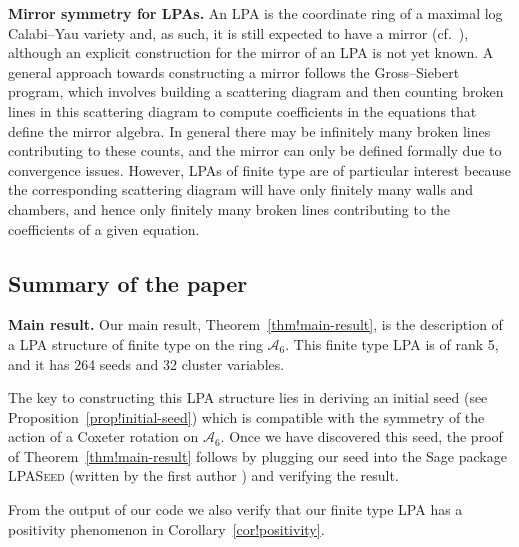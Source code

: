 \documentclass[pdftex]{sigma}
\numberwithin{equation}{section}
\theoremstyle{definition}
\begin{document}
{\bf Mirror symmetry for LPAs.}
An LPA is the coordinate ring of a maximal log Calabi--Yau variety and, as such, it is still expected to have a mirror (cf.\ \cite[Conjecture 2.5]{duc}), although an explicit construction for the mirror of an LPA is not yet known. A general approach towards constructing a mirror follows the Gross--Siebert program, which involves building a scattering diagram and then counting broken lines in this scattering diagram to compute coefficients in the equations that define the mirror algebra. In general there may be infinitely many broken lines contributing to these counts, and the mirror can only be defined formally due to convergence issues. However, LPAs of finite type are of particular interest because the corresponding scattering diagram will have only finitely many walls and chambers, and hence only finitely many broken lines contributing to the coefficients of a given equation.

\subsection{Summary of the paper}

{\bf Main result.}
Our main result, Theorem~\ref{thm!main-result}, is the description of a LPA structure of finite type on the ring $\mathcal A_6$. This finite type LPA is of rank 5, and it has 264 seeds and 32 cluster variables.

The key to constructing this LPA structure lies in deriving an initial seed (see Proposition~\ref{prop!initial-seed}) which is compatible with the symmetry of the action of a Coxeter rotation on $\mathcal A_6$. Once we have discovered this seed, the proof of Theorem~\ref{thm!main-result} follows by plugging our seed into the Sage package \textsc{LPASeed} (written by the first author \cite{sagecode}) and verifying the result.

From the output of our code we also verify that our finite type LPA has a positivity phenomenon in Corollary~\ref{cor!positivity}.
\end{document}
